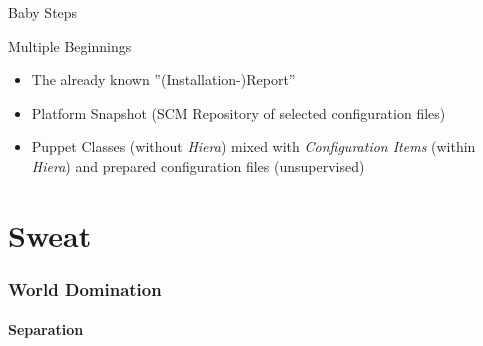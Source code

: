 \documentclass[ngerman,xcolor={table,dvipsnames},smaller,compress,hyperref={bookmarks,colorlinks}]{beamer}%
\begin{document}
\begin{frame}[fragile]{Baby Steps}
\begin{block}{Multiple Beginnings}
\begin{itemize}
\item The already known ''(Installation-)Report''
\item<2-> Platform Snapshot (SCM Repository of selected configuration files)
\item<3-> Puppet Classes (without \textit{Hiera}) mixed with \textit{Configuration Items} (within \textit{Hiera}) and prepared configuration files (unsupervised)
\end{itemize}
\end{block}
\end{frame}

\part{Sweat}

\section{World Domination}

\subsection{Separation}
\end{document}
